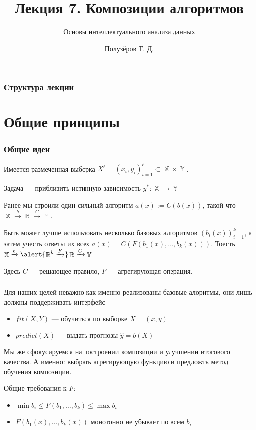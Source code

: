 \documentclass{beamer}
\title[Ансамбли]{Лекция 7. Композиции алгоритмов}
\subtitle{Основы интеллектуального анализа данных}
\author{Полузёров Т. Д.}
\institute{БГУ ФПМИ}
\date{}
\DeclareMathOperator{\R}{\mathbb{R}}
\DeclareMathOperator{\X}{\mathbb{X}}
\DeclareMathOperator{\Y}{\mathbb{Y}}
\begin{document}
	
	\begin{frame}
		\titlepage
	\end{frame}
	
	
	\begin{center}
		\frametitle{Структура лекции}
		\tableofcontents
	\end{center}
	
	\section{Общие принципы}

	\begin{frame}
		\frametitle{Общие идеи}

		Имеется размеченная выборка $X^{\ell} = (x_i, y_i)_{i=1}^{\ell} \subset \X \times \Y$. 
		
		Задача --- приблизить истинную зависимость $y^{*}: \X \rightarrow \Y$

		\vspace{15pt}

		Ранее мы строили один сильный алгоритм $a(x) := C(b(x))$, такой что $\X \xrightarrow{b} \R \xrightarrow{C} \Y$.
		
		\vspace{15pt}

		Быть может лучше использовать несколько базовых алгоритмов $(b_i(x))_{i=1}^{k}$, а затем учесть ответы их всех
		$a(x) = C(F(b_1(x), \dots, b_k(x)))$. Тоесть $\X \xrightarrow{b} \alert{ \R^k \xrightarrow{F}} \R \xrightarrow{C} \Y$

		\vspace{15pt}

		Здесь $C$ --- решающее правило, $F$ --- агрегирующая операция.
	\end{frame}

	\begin{frame}
		\frametitle{}
		
		Для наших целей неважно как именно реализованы базовые алоритмы, они лишь должны поддерживать интерфейс
		\begin{itemize}
			\item $fit(X, Y)$ --- обучиться по выборке $X = (x, y)$
			\item $predict(X)$ --- выдать прогнозы $\hat{y} = b(X)$
		\end{itemize}

		\vspace{15pt}

		Мы же сфокусируемся на построении композиции и улучшении итогового качества.
		А именно: выбрать агрегирующую функцию и предложть метод обучения композиции.

		\vspace{15pt}

		Общие требования к $F$:
		\begin{itemize}
			\item $\min b_i \le F(b_1, \dots, b_k) \le \max b_i$
			\item $F(b_1(x), \dots, b_k(x))$ монотонно не убывает по всем $b_i$
		\end{itemize}	
	\end{frame}
\end{document}

